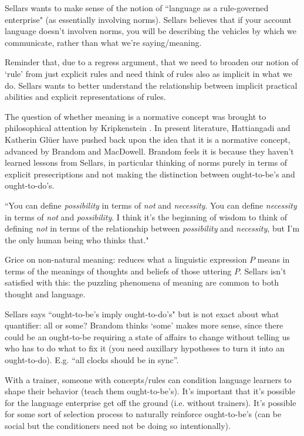 Sellars wants to make sense of the notion of ``language as a rule-governed enterprise" (as essentially involving norms). Sellars believes that if your account language doesn't involven norms, you will be describing the vehicles by which we communicate, rather than what we're saying/meaning.

Reminder that, due to a regress argument, that we need to broaden our notion of `rule' from just explicit rules and need think of rules also as implicit in what we do. Sellars wants to better understand the relationship between implicit practical abilities and explicit representations of rules.

The question of whether meaning is a normative concept was brought to philosophical attention by Kripkenstein \cite{kripke1982wittgenstein}. In present literature, Hattiangadi and Katherin Gl{\"u}er have pushed back upon the idea that it is a normative concept, advanced by Brandom and MacDowell. Brandom feels it is because they haven't learned lessons from Sellars, in particular thinking of norms purely in terms of explicit presecriptions and not making the distinction between ought-to-be's and ought-to-do's.

``You can define \emph{possibility} in terms of \emph{not} and \emph{necessity}. You can define \emph{necessity} in terms of \emph{not} and \emph{possibility}. I think it's the beginning of wisdom to think of defining \emph{not} in terms of the relationship between \emph{possibility} and \emph{necessity}, but I'm the only human being who thinks that."

Grice on non-natural meaning: reduces what a linguistic expression $P$ means in terms of the meanings of thoughts and beliefs of those uttering $P$. Sellars isn't satisfied with this: the puzzling phenomena of meaning are common to both thought and language.

Sellars says ``ought-to-be's imply ought-to-do's" but is not exact about what quantifier: all or some? Brandom thinks `some' makes more sense, since there could be an ought-to-be requiring a state of affairs to change without telling us who has to do what to fix it (you need auxillary hypotheses to turn it into an ought-to-do). E.g. ``all clocks should be in sync''.

With a trainer, someone with concepts/rules can condition language learners to shape their behavior (teach them ought-to-be's). It's important that it's possible for the language enterprise get off the ground (i.e. without trainers). It's possible for some sort of selection process to naturally reinforce ought-to-be's (can be social but the conditioners need not be doing so intentionally).

